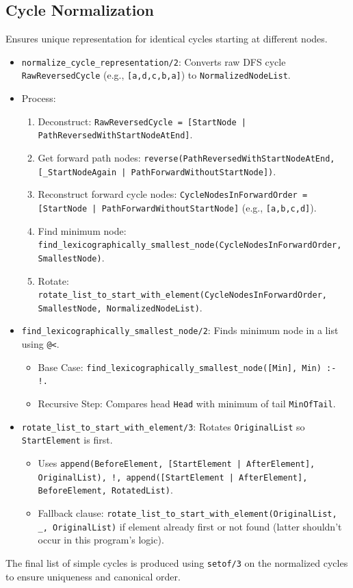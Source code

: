 \documentclass[12pt,a4paper]{article}
\begin{document}
\subsection{Cycle Normalization}
Ensures unique representation for identical cycles starting at different nodes.
\begin{itemize}
\item \texttt{normalize\_cycle\_representation/2}: Converts raw DFS cycle \texttt{RawReversedCycle} (e.g., \texttt{[a,d,c,b,a]}) to \texttt{NormalizedNodeList}.
\item Process:
\begin{enumerate}
\item Deconstruct: \texttt{RawReversedCycle = [StartNode | PathReversedWithStartNodeAtEnd]}.
\item Get forward path nodes: \texttt{reverse(PathReversedWithStartNodeAtEnd, [\_StartNodeAgain | PathForwardWithoutStartNode])}.
\item Reconstruct forward cycle nodes: \texttt{CycleNodesInForwardOrder = [StartNode | PathForwardWithoutStartNode]} (e.g., \texttt{[a,b,c,d]}).
\item Find minimum node: \texttt{find\_lexicographically\_smallest\_node(CycleNodesInForwardOrder, SmallestNode)}.
\item Rotate: \texttt{rotate\_list\_to\_start\_with\_element(CycleNodesInForwardOrder, SmallestNode, NormalizedNodeList)}.
\end{enumerate}
\item \texttt{find\_lexicographically\_smallest\_node/2}: Finds minimum node in a list using \texttt{@<}.
\begin{itemize}
\item Base Case: \texttt{find\_lexicographically\_smallest\_node([Min], Min) :- !.}
\item Recursive Step: Compares head \texttt{Head} with minimum of tail \texttt{MinOfTail}.
\end{itemize}
\item \texttt{rotate\_list\_to\_start\_with\_element/3}: Rotates \texttt{OriginalList} so \texttt{StartElement} is first.
\begin{itemize}
\item Uses \texttt{append(BeforeElement, [StartElement | AfterElement], OriginalList), !, append([StartElement | AfterElement], BeforeElement, RotatedList)}.
\item Fallback clause: \texttt{rotate\_list\_to\_start\_with\_element(OriginalList, \_, OriginalList)} if element already first or not found (latter shouldn't occur in this program's logic).
\end{itemize}
\end{itemize}
The final list of simple cycles is produced using \texttt{setof/3} on the normalized cycles to ensure uniqueness and canonical order.
\end{document}
